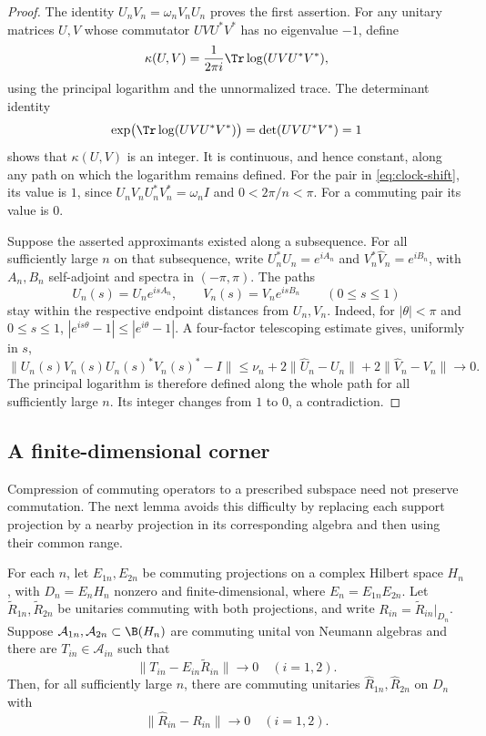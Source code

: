 \begin{proof}
The identity $U_nV_n=\omega_nV_nU_n$ proves the first assertion.
For any unitary matrices $U,V$ whose commutator $UVU^*V^*$ has no
eigenvalue $-1$, define
\[
 \kappa(U,V)=\frac{1}{2\pi i}\Tr\log(UVU^*V^*),
\]
using the principal logarithm and the unnormalized trace.
The determinant identity
\[
 \exp\bigl(\Tr\log(UVU^*V^*)\bigr)
       =\det(UVU^*V^*)=1
\]
shows that $\kappa(U,V)$ is an integer. It is continuous, and hence
constant, along any path on which the logarithm remains defined.
For the pair in \eqref{eq:clock-shift}, its value is $1$, since
$U_nV_nU_n^*V_n^*=\omega_n I$ and $0<2\pi/n<\pi$.
For a commuting pair its value is $0$.

Suppose the asserted approximants existed along a subsequence.
For all sufficiently large $n$ on that subsequence, write
$U_n^*\widehat U_n=e^{iA_n}$ and
$V_n^*\widehat V_n=e^{iB_n}$, with $A_n,B_n$ self-adjoint and
spectra in $(-\pi,\pi)$. The paths
\[
 U_n(s)=U_ne^{isA_n},\qquad
 V_n(s)=V_ne^{isB_n}\qquad(0\leq s\leq1)
\]
stay within the respective endpoint distances from $U_n,V_n$.
Indeed, for $|\theta|<\pi$ and $0\leq s\leq1$,
$|e^{is\theta}-1|\leq|e^{i\theta}-1|$.
A four-factor telescoping estimate gives, uniformly in $s$,
\[
 \|U_n(s)V_n(s)U_n(s)^*V_n(s)^*-I\|
 \leq \nu_n+2\|\widehat U_n-U_n\|
             +2\|\widehat V_n-V_n\|\longrightarrow0.
\]
The principal logarithm is therefore defined along the whole path
for all sufficiently large $n$. Its integer changes from $1$ to $0$,
a contradiction.
\end{proof}

\subsection{A finite-dimensional corner}
Compression of commuting operators to a prescribed subspace need not
preserve commutation. The next lemma avoids this difficulty by
replacing each support projection by a nearby projection in its
corresponding algebra and then using their common range.

\begin{lemma}\label{lem:corner}
For each $n$, let $E_{1n},E_{2n}$ be commuting projections on a complex
Hilbert space $H_n$, with $D_n=E_nH_n$ nonzero and finite-dimensional,
where $E_n=E_{1n}E_{2n}$. Let $\widetilde R_{1n},\widetilde R_{2n}$
be unitaries commuting with both projections, and write
$R_{in}=\widetilde R_{in}|_{D_n}$.
Suppose $\mathcal A_{1n},\mathcal A_{2n}\subset\B(H_n)$ are
commuting unital von Neumann algebras and there are
$T_{in}\in\mathcal A_{in}$ such that
\begin{equation}\label{eq:corner-hypothesis}
 \|T_{in}-E_{in}\widetilde R_{in}\|\longrightarrow0
 \quad(i=1,2).
\end{equation}
Then, for all sufficiently large $n$, there are commuting unitaries
$\widehat R_{1n},\widehat R_{2n}$ on $D_n$ with
\[
 \|\widehat R_{in}-R_{in}\|\longrightarrow0\quad(i=1,2).
\]
\end{lemma}

